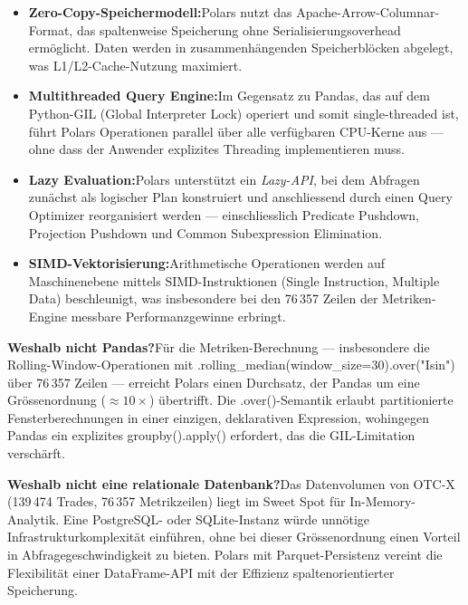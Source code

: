 \documentclass[11pt, a4paper, oneside, openany]{report}
\newcommand{\code}[1]{{\codefont\small\textcolor{DeepNavy}{#1}}}
\begin{document}
\begin{infobox}
\begin{itemize}
  \item \textbf{Zero-Copy-Speichermodell:}\;Polars nutzt das Apache-Arrow-Columnar-Format, das spaltenweise Speicherung ohne Serialisierungsoverhead ermöglicht. Daten werden in zusammenhängenden Speicherblöcken abgelegt, was L1/L2-Cache-Nutzung maximiert.
  \item \textbf{Multithreaded Query Engine:}\;Im Gegensatz zu Pandas, das auf dem Python-GIL (Global Interpreter Lock) operiert und somit single-threaded ist, führt Polars Operationen parallel über alle verfügbaren CPU-Kerne aus --- ohne dass der Anwender explizites Threading implementieren muss.
  \item \textbf{Lazy Evaluation:}\;Polars unterstützt ein \textit{Lazy-API}, bei dem Abfragen zunächst als logischer Plan konstruiert und anschliessend durch einen Query Optimizer reorganisiert werden --- einschliesslich Predicate Pushdown, Projection Pushdown und Common Subexpression Elimination.
  \item \textbf{SIMD-Vektorisierung:}\;Arithmetische Operationen werden auf Maschinenebene mittels SIMD-Instruktionen (Single Instruction, Multiple Data) beschleunigt, was insbesondere bei den 76\,357 Zeilen der Metriken-Engine messbare Performanzgewinne erbringt.
\end{itemize}
\end{infobox}

\textbf{Weshalb nicht Pandas?}\;Für die Metriken-Berechnung --- insbesondere die Rolling-Window-Operationen mit \code{.rolling\_median(window\_size=30).over("Isin")} über 76\,357 Zeilen --- erreicht Polars einen Durchsatz, der Pandas um eine Grössenordnung ($\approx 10\times$) übertrifft. Die \code{.over()}-Semantik erlaubt partitionierte Fensterberechnungen in einer einzigen, deklarativen Expression, wohingegen Pandas ein explizites \code{groupby().apply()} erfordert, das die GIL-Limitation verschärft.

\textbf{Weshalb nicht eine relationale Datenbank?}\;Das Datenvolumen von OTC-X (139\,474 Trades, 76\,357 Metrikzeilen) liegt im Sweet Spot für In-Memory-Analytik. Eine PostgreSQL- oder SQLite-Instanz würde unnötige Infrastrukturkomplexität einführen, ohne bei dieser Grössenordnung einen Vorteil in Abfragegeschwindigkeit zu bieten. Polars mit Parquet-Persistenz vereint die Flexibilität einer DataFrame-API mit der Effizienz spaltenorientierter Speicherung.
\end{document}
